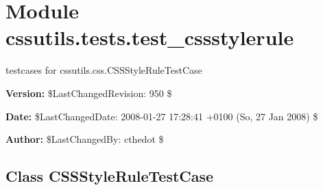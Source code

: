 %
%
%


\section{Module cssutils.tests.test\_cssstylerule}

    \label{cssutils:tests:test_cssstylerule}
testcases for cssutils.css.CSSStyleRuleTestCase

\textbf{Version:} \$LastChangedRevision: 950 \$



\textbf{Date:} \$LastChangedDate: 2008-01-27 17:28:41 +0100 (So, 27 Jan 2008) \$



\textbf{Author:} \$LastChangedBy: cthedot \$





\subsection{Class CSSStyleRuleTestCase}

